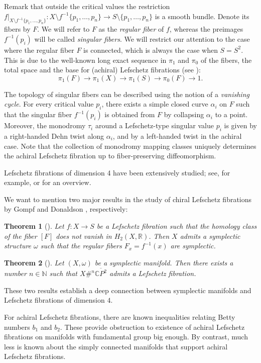 \documentclass{article}
\theoremstyle{plain}
\newtheorem{thm}{Theorem}[section]
\theoremstyle{remark}
\theoremstyle{definition}
\begin{document}
Remark that outside the critical values the restriction $f|_{X\setminus f^{-1}\{p_1,\dots,p_n\}} : X\setminus f^{-1}\{p_1,\dots,p_n\} \to S\setminus \{p_1,\dots,p_n\}$ is a smooth bundle. Denote its fibers by $F$. We will refer to $F$ as the \emph{regular fiber} of $f$, whereas the preimages $f^{-1}(p_i)$ will be called \emph{singular fibers}. We will restrict our attention to the case where the regular fiber $F$ is connected, which is always the case when $S=S^2$. This is due to the well-known long exact sequence in $\pi_1$ and $\pi_0$ of the fibers, the total space and the base for (achiral) Lefschetz fibrations (see \cite[Proposition 8.1.9]{GompfStipsicz}): 
$$
\pi_1(F)\to\pi_1(X)\to\pi_1(S)\to\pi_0(F)\to 1.
$$
\par
The topology of singular fibers can be described using the notion of a \emph{vanishing cycle}. For every critical value $p_i$, there exists a simple closed curve $\alpha_i$ on $F$ such that the singular fiber $f^{-1}(p_i)$ is obtained from $F$ by collapsing $\alpha_i$ to a point. Moreover, the monodromy $\tau_i$ around a Lefschetz-type singular value $p_i$ is given by a right-handed Dehn twist along $\alpha_i$, and by a left-handed twist in the achiral case. Note that the collection of monodromy mapping classes uniquely determines the achiral Lefschetz fibration up to fiber-preserving diffeomorphism. \par 
Lefschetz fibrations of dimension 4 have been extensively studied; see, for example, \cite[Chapter 8]{GompfStipsicz} or \cite[Chapter 7]{Akbulut} for an overview. \par 
We want to mention two major results in the study of chiral Lefschetz fibrations by Gompf \cite{Gompf} and Donaldson \cite{Donaldson}, respectively\thinspace:
\begin{thm}[\cite{Gompf}]
    Let $f:X\to S$ be a Lefschetz fibration such that the homology class of the fiber $[F]$ does not vanish in $H_2(X,\mathbb{R})$. Then $X$ admits a symplectic structure $\omega$ such that the regular fibers $F_x = f^{-1}(x)$ are symplectic.
\end{thm}
\begin{thm}[\cite{Donaldson}]
    Let $(X,\omega)$ be a symplectic manifold. Then there exists a number $n\in \mathbb{N}$ such that $X\#^n \overline{\mathbb{C}P^2}$ admits a Lefschetz fibration.
\end{thm}
These two results establish a deep connection between symplectic manifolds and Lefschetz fibrations of dimension $4$. \par 
For achiral Lefschetz fibrations, there are known inequalities relating Betty numbers $b_1$ and $b_2$. These provide obstruction to existence of achiral Lefschetz fibrations on manifolds with fundamental group big enough. By contrast, much less is known about the simply connected manifolds that support achiral Lefschetz fibrations.
\end{document}
